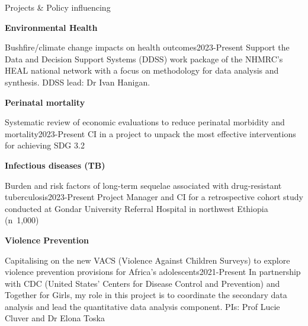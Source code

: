 \begin{rSection}{Projects \& Policy influencing}

\begin{etaremune}

\vspace{1em}

\item \textbf{Environmental Health}\par

\begin{rSubsection}
{Bushfire/climate change impacts on health outcomes}{2023-Present}
{Support the Data and Decision Support Systems (DDSS) work package of the NHMRC’s HEAL national network with a focus on methodology for data analysis and synthesis. DDSS lead: Dr Ivan Hanigan.} \par
\end{rSubsection}

\vspace{1em}

\item \textbf{Perinatal mortality}\par

\begin{rSubsection}
{Systematic review of economic evaluations to reduce perinatal morbidity and mortality}{2023-Present}
{CI in a project to unpack the most effective interventions for achieving SDG 3.2} \par
\end{rSubsection}

\vspace{1em}

\item \textbf{Infectious diseases (TB)}\par

\begin{rSubsection}
{Burden and risk factors of long-term sequelae associated with drug-resistant tuberculosis}{2023-Present}
{Project Manager and CI for a retrospective cohort study conducted at Gondar University Referral Hospital in northwest Ethiopia (n~1,000)} \par
\end{rSubsection}

\vspace{1em}

\item \textbf{Violence Prevention}\par

\begin{rSubsection}
{Capitalising on the new VACS (Violence Against Children Surveys) to explore violence prevention provisions for Africa’s adolescents}{2021-Present}
{In partnership with CDC (United States' Centers for Disease Control and Prevention) and Together for Girls, my role in this project is to coordinate the secondary data analysis and lead the quantitative data analysis component. PIs: Prof Lucie Cluver and Dr Elona Toska} \par
\end{rSubsection}


\end{etaremune}
\end{rSection}
